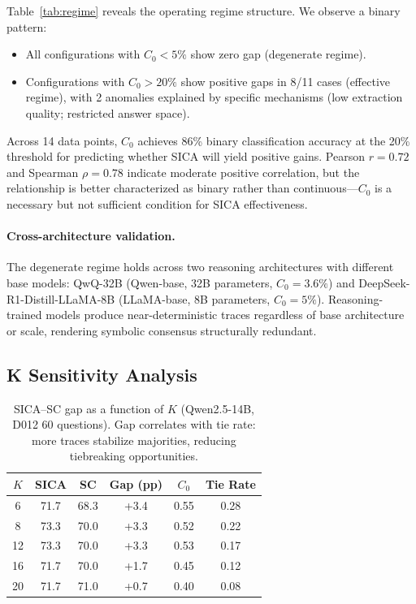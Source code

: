 \documentclass[11pt,a4paper]{article}
\begin{document}
Table~\ref{tab:regime} reveals the operating regime structure. We observe a binary pattern:
\begin{itemize}
\item All configurations with $C_0 < 5\%$ show zero gap (degenerate regime).
\item Configurations with $C_0 > 20\%$ show positive gaps in 8/11 cases (effective regime), with 2 anomalies explained by specific mechanisms (low extraction quality; restricted answer space).
\end{itemize}

Across 14 data points, $C_0$ achieves 86\% binary classification accuracy at the 20\% threshold for predicting whether SICA will yield positive gains. Pearson $r = 0.72$ and Spearman $\rho = 0.78$ indicate moderate positive correlation, but the relationship is better characterized as binary rather than continuous---$C_0$ is a necessary but not sufficient condition for SICA effectiveness.

\paragraph{Cross-architecture validation.} The degenerate regime holds across two reasoning architectures with different base models: QwQ-32B (Qwen-base, 32B parameters, $C_0=3.6\%$) and DeepSeek-R1-Distill-LLaMA-8B (LLaMA-base, 8B parameters, $C_0=5\%$). Reasoning-trained models produce near-deterministic traces regardless of base architecture or scale, rendering symbolic consensus structurally redundant.

\subsection{K Sensitivity Analysis}

\begin{table}[t]
\centering
\small
\begin{tabular}{@{}cccccc@{}}
\toprule
$K$ & SICA & SC & Gap (pp) & $C_0$ & Tie Rate \\
\midrule
6 & 71.7 & 68.3 & +3.4 & 0.55 & 0.28 \\
8 & 73.3 & 70.0 & +3.3 & 0.52 & 0.22 \\
12 & 73.3 & 70.0 & +3.3 & 0.53 & 0.17 \\
16 & 71.7 & 70.0 & +1.7 & 0.45 & 0.12 \\
20 & 71.7 & 71.0 & +0.7 & 0.40 & 0.08 \\
\bottomrule
\end{tabular}
\caption{SICA--SC gap as a function of $K$ (Qwen2.5-14B, D012 60 questions). Gap correlates with tie rate: more traces stabilize majorities, reducing tiebreaking opportunities.}
\label{tab:k_sensitivity}
\end{table}
\end{document}
